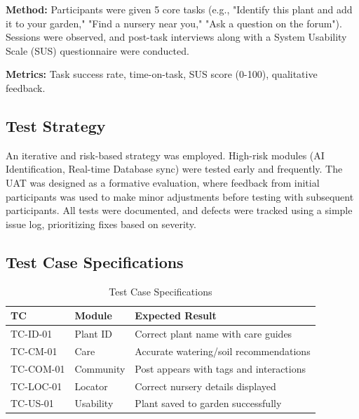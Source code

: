\documentclass[conference]{IEEEtran}
\begin{document}
\textbf{Method:} Participants were given 5 core tasks (e.g., "Identify this plant and add it to your garden," "Find a nursery near you," "Ask a question on the forum"). Sessions were observed, and post-task interviews along with a System Usability Scale (SUS) questionnaire were conducted.

\textbf{Metrics:} Task success rate, time-on-task, SUS score (0-100), qualitative feedback.

\subsection{Test Strategy}
An iterative and risk-based strategy was employed. High-risk modules (AI Identification, Real-time Database sync) were tested early and frequently. The UAT was designed as a formative evaluation, where feedback from initial participants was used to make minor adjustments before testing with subsequent participants. All tests were documented, and defects were tracked using a simple issue log, prioritizing fixes based on severity.

\subsection{Test Case Specifications}
\begin{table}[h]
\centering
\caption{Test Case Specifications}
\label{tab:test_cases}
\footnotesize
\begin{tabular}{|l|l|p{5cm}|}
\hline
\textbf{TC} & \textbf{Module} & \textbf{Expected Result} \\
\hline
TC-ID-01 & Plant ID & Correct plant name with care guides \\
\hline
TC-CM-01 & Care & Accurate watering/soil recommendations \\
\hline
TC-COM-01 & Community & Post appears with tags and interactions \\
\hline
TC-LOC-01 & Locator & Correct nursery details displayed \\
\hline
TC-US-01 & Usability & Plant saved to garden successfully \\
\hline
\end{tabular}
\end{table}
\end{document}
